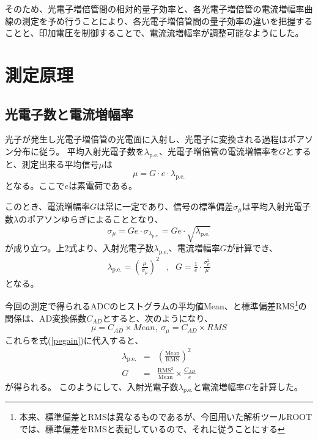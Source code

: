 \documentclass[11pt]{jreport}
\newcommand{\equref}[1]{式(\ref{#1})}
\newcommand{\pe}{\mathrm{p.e.}}
\begin{document}
そのため、光電子増倍管間の相対的量子効率と、各光電子増倍管の電流増幅率曲線の測定を予め行うことにより、各光電子増倍管間の量子効率の違いを把握することと、印加電圧を制御することで、電流流増幅率が調整可能なようにした。



\section{測定原理}

\subsection{光電子数と電流増幅率}

光子が発生し光電子増倍管の光電面に入射し、光電子に変換される過程はポアソン分布に従う。
平均入射光電子数を$\lambda_{\pe}$、光電子増倍管の電流増幅率を$G$とすると、測定出来る平均信号$\mu$は
\begin{equation}
\mu = G\cdot e \cdot\lambda_{\pe}
\label{mu}
\end{equation}
となる。ここで$e$は素電荷である。

このとき、電流増幅率$G$は常に一定であり、信号の標準偏差$\sigma_{\mu}$は平均入射光電子数$\lambda$のポアソンゆらぎによることとなり、
\begin{equation}
\sigma_{\mu} = Ge\cdot \sigma_{\lambda_{\pe}}=Ge\cdot \sqrt{\lambda_{\pe}}
\label{sigmamu}
\end{equation}
が成り立つ。上2式より、入射光電子数$\lambda_{\pe}$、電流増幅率$G$が計算でき、
\begin{eqnarray}
\lambda_{\pe} = \left(\frac{\mu}{\sigma_{\mu}}\right)^{2}
&, & G  =  \frac{1}{e}\cdot \frac{\sigma_{\mu}^{2}}{\mu} \label{pegain}
\end{eqnarray}
となる。

今回の測定で得られるADCのヒストグラムの平均値Mean、と標準偏差RMS\footnote{本来、標準偏差とRMSは異なるものであるが、今回用いた解析ツールROOTでは、標準偏差をRMSと表記しているので、それに従うことにする}の関係は、AD変換係数$C_{AD}$とすると、次のようになり、
\begin{equation}
\mu = C_{AD} \times Mean,\  \sigma_{\mu} = C_{AD} \times RMS
\end{equation}
これらを\equref{pegain}に代入すると、
\begin{eqnarray}
\lambda_{\pe} & = & \left(\mathrm{\frac{Mean}{RMS}}\right)^{2}\\
G & = & \mathrm{\frac{RMS^{2}}{Mean}} \times \frac{C_{AD}}{e} \label{adcrms}
\end{eqnarray}
が得られる。
このようにして、入射光電子数$\lambda_{\pe}$と電流増幅率$G$を計算した。
\end{document}
